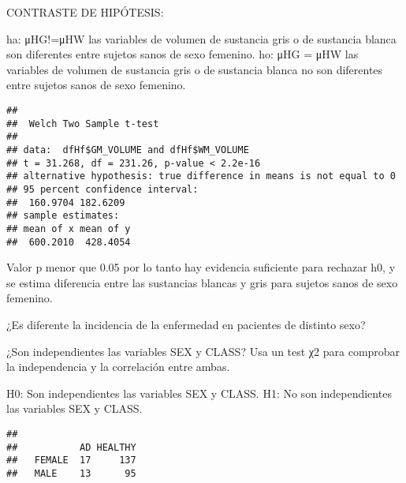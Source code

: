 \documentclass[
]{article}
\newenvironment{Shaded}{\begin{snugshade}}{\end{snugshade}}
\newcommand{\AttributeTok}[1]{\textcolor[rgb]{0.77,0.63,0.00}{#1}}
\newcommand{\FunctionTok}[1]{\textcolor[rgb]{0.00,0.00,0.00}{#1}}
\newcommand{\NormalTok}[1]{#1}
\newcommand{\OtherTok}[1]{\textcolor[rgb]{0.56,0.35,0.01}{#1}}
\newcommand{\SpecialCharTok}[1]{\textcolor[rgb]{0.00,0.00,0.00}{#1}}
\newcommand{\StringTok}[1]{\textcolor[rgb]{0.31,0.60,0.02}{#1}}
\begin{document}
CONTRASTE DE HIPÓTESIS:

ha: μHG!=μHW las variables de volumen de sustancia gris o de sustancia
blanca son diferentes entre sujetos sanos de sexo femenino. ho: μHG =
μHW las variables de volumen de sustancia gris o de sustancia blanca no
son diferentes entre sujetos sanos de sexo femenino.

\begin{Shaded}
\end{Shaded}

\begin{verbatim}
## 
##  Welch Two Sample t-test
## 
## data:  dfHf$GM_VOLUME and dfHf$WM_VOLUME
## t = 31.268, df = 231.26, p-value < 2.2e-16
## alternative hypothesis: true difference in means is not equal to 0
## 95 percent confidence interval:
##  160.9704 182.6209
## sample estimates:
## mean of x mean of y 
##  600.2010  428.4054
\end{verbatim}

Valor p menor que 0.05 por lo tanto hay evidencia suficiente para
rechazar h0, y se estima diferencia entre las sustancias blancas y gris
para sujetos sanos de sexo femenino.

¿Es diferente la incidencia de la enfermedad en pacientes de distinto
sexo?

¿Son independientes las variables SEX y CLASS? Usa un test χ2 para
comprobar la independencia y la correlación entre ambas.

H0: Son independientes las variables SEX y CLASS. H1: No son
independientes las variables SEX y CLASS.

\begin{Shaded}
\end{Shaded}

\begin{verbatim}
##         
##           AD HEALTHY
##   FEMALE  17     137
##   MALE    13      95
\end{verbatim}
\end{document}
